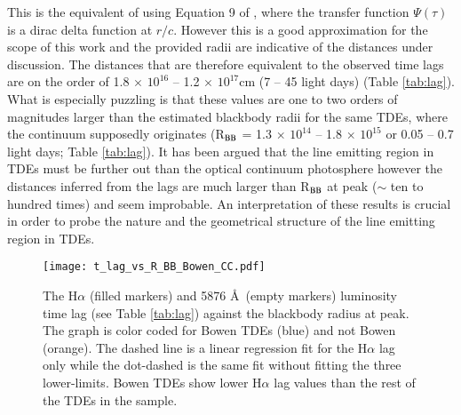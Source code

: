 \documentclass[structabstract]{aa}
\begin{document}
This is the equivalent of using Equation 9 of \citet{Peterson1993}, where the transfer function $\Psi(\tau)$ is a dirac delta function at $r/c$. However this is a good approximation for the scope of this work and the provided radii are indicative of the distances under discussion.
The distances that are therefore equivalent to the observed time lags are on the order of 
1.8$\,\times\,10^{16}$ -- 1.2$\,\times\,10^{17}$cm (7 -- 45 light days) (Table \ref{tab:lag}).
What is especially puzzling is that these values are one to two orders of magnitudes larger than the estimated blackbody radii for the same TDEs, where the continuum supposedly originates (R$_{\rm BB}$ = 1.3$\,\times\,10^{14}$ -- 1.8$\,\times\,10^{15}$ or 0.05 -- 0.7 light days; Table \ref{tab:lag}). It has been argued that the line emitting region in TDEs must be further out than the optical continuum photosphere \citep{Roth2016} however the distances inferred from the lags are much larger than R$_{\rm BB}$ at peak ($\sim$ ten to hundred times) and seem improbable. An interpretation of these results is crucial in order to probe the nature and the geometrical structure of the line emitting region in TDEs. 


\begin{figure}
\centering
\texttt{[image: t\_lag\_vs\_R\_BB\_Bowen\_CC.pdf]}
\caption{The H$\alpha$ (filled markers) and  5876 \AA\, (empty markers) luminosity time lag (see Table \ref{tab:lag}) against the blackbody radius at peak. The graph is color coded for Bowen  TDEs (blue) and not Bowen (orange). The dashed line is a linear regression fit for the H$\alpha$ lag only while the dot-dashed is the same fit without fitting the three lower-limits.  Bowen TDEs show lower H$\alpha$ lag values than the rest of the TDEs in the sample.}
\label{fig:tlagvsRBB}
\end{figure}
\end{document}
